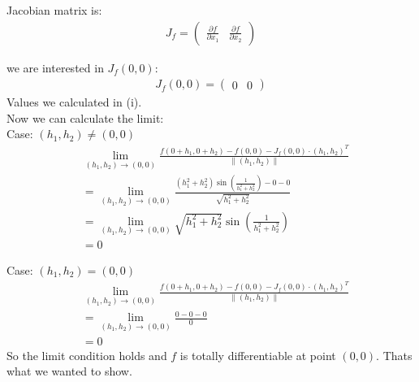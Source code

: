 \documentclass{article}
\begin{document}
Jacobian matrix is:
\begin{align*}
   J_f = \begin{pmatrix}
      \frac{\partial f}{\partial x_1} & \frac{\partial f}{\partial x_2}
   \end{pmatrix}
\end{align*}

we are interested in \(J_f(0,0)\):
\begin{align*}
   J_f(0,0) = \begin{pmatrix}
      0 & 0
   \end{pmatrix}
\end{align*}
Values we calculated in (i). \\
Now we can calculate the limit: \\
Case: \((h_1, h_2) \neq (0,0)\)
\begin{align*}
   &\lim_{(h_1, h_2) \to (0,0)} \frac{f(0 + h_1, 0 + h_2) - f(0,0) - J_f(0,0) \cdot (h_1, h_2)^T}{\|(h_1, h_2)\|} \\
   &= \lim_{(h_1, h_2) \to (0,0)} \frac{(h_1^2 + h_2^2) \sin\left(\frac{1}{h_1^2 + h_2^2}\right) - 0 - 0}{\sqrt{h_1^2 + h_2^2}} \\
   &= \lim_{(h_1, h_2) \to (0,0)} \sqrt{h_1^2 + h_2^2} \sin\left(\frac{1}{h_1^2 + h_2^2}\right) \\
   &= 0
\end{align*}

Case: \((h_1, h_2) = (0,0)\)
\begin{align*}
   &\lim_{(h_1, h_2) \to (0,0)} \frac{f(0 + h_1, 0 + h_2) - f(0,0) - J_f(0,0) \cdot (h_1, h_2)^T}{\|(h_1, h_2)\|} \\
   &= \lim_{(h_1, h_2) \to (0,0)} \frac{0 - 0 - 0}{0} \\
   &= 0
\end{align*}
So the limit condition holds and \(f\) is totally differentiable at point \((0,0)\). Thats what we wanted to show.
\end{document}
